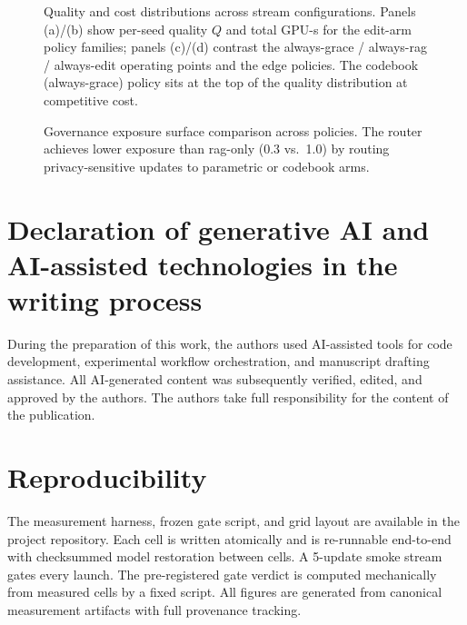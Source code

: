 \documentclass[preprint,12pt]{elsarticle}
\begin{document}
\begin{figure}[!ht]
\centering

\caption{Quality and cost distributions across stream configurations. Panels (a)/(b)
show per-seed quality $Q$ and total GPU-s for the edit-arm policy families; panels
(c)/(d) contrast the always-grace / always-rag / always-edit operating points and the
edge policies. The codebook (always-grace) policy sits at the top of the quality
distribution at competitive cost.}
\label{fig:failure-modes-app}
\end{figure}

\begin{figure}[!ht]
\centering

\caption{Governance exposure surface comparison across policies. The router achieves
lower exposure than rag-only (0.3 vs.\ 1.0) by routing privacy-sensitive updates to
parametric or codebook arms.}
\label{fig:governance-app}
\end{figure}

\section*{Declaration of generative AI and AI-assisted technologies in the writing process}

During the preparation of this work, the authors used AI-assisted tools for code
development, experimental workflow orchestration, and manuscript drafting assistance.
All AI-generated content was subsequently verified, edited, and approved by the
authors. The authors take full responsibility for the content of the publication.

\section*{Reproducibility}

The measurement harness, frozen gate script, and grid layout are available in the
project repository. Each cell is written atomically and is re-runnable end-to-end with
checksummed model restoration between cells. A 5-update smoke stream gates every
launch. The pre-registered gate verdict is computed mechanically from measured cells
by a fixed script. All figures are generated from canonical measurement artifacts with
full provenance tracking.
\end{document}
